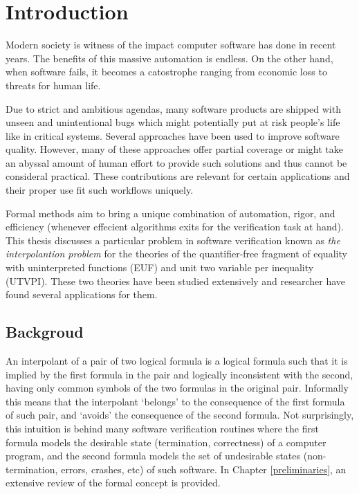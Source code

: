 \chapter{Introduction}

Modern society is witness of the impact computer software 
has done in recent years. The benefits of this massive 
automation is endless. On the other hand, when software 
fails, it becomes a catostrophe ranging from economic loss
to threats for human life. 

Due to strict and ambitious agendas, many software products
are shipped with unseen and unintentional bugs which might potentially put
at risk people's life like in critical systems. Several approaches have been 
used to improve software quality. However, many of these approaches 
offer partial coverage or might take an abyssal amount of human effort to 
provide such solutions and thus cannot be consideral practical. These 
contributions are relevant for certain applications and their proper 
use fit such workflows uniquely. 

Formal methods aim to bring a unique combination of automation, rigor, and 
efficiency (whenever effecient algorithms exits for the verification task
at hand). This thesis discusses a particular problem in software verification
known as \emph{the interpolantion problem} for the theories of the quantifier-free
fragment of equality with uninterpreted functions (EUF) and unit two variable per
inequality (UTVPI). These two theories have been studied extensively and 
researcher have found several applications for them. 

\section{Backgroud}

An interpolant of a pair of two logical formula is a logical formula
such that it is implied by the first formula in the pair and logically
inconsistent with the second, having only common symbols of the 
two formulas in the original pair. Informally this means that the 
interpolant `belongs' to the consequence of the first formula of 
such pair, and `avoids' the consequence of the second formula. 
Not surprisingly, this intuition is behind many software verification 
routines where the first formula models the desirable state 
(termination, correctness) of a computer program, and the second 
formula models the set of undesirable states (non-termination, 
errors, crashes, etc) of such software. In Chapter 
\ref{preliminaries}, an extensive review of the formal concept 
is provided.

